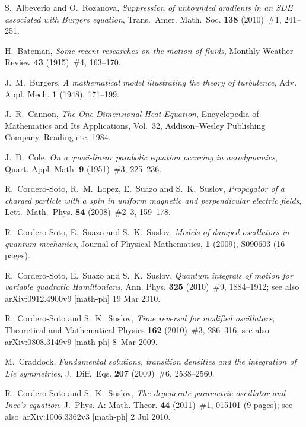\documentclass[12pt,reqno]{amsart}
\theoremstyle{plain}
\numberwithin{equation}{section}
\begin{document}
\begin{thebibliography}{99}
 S.~Albeverio and O.~Rozanova, \emph{Suppression of
unbounded gradients in an SDE associated with Burgers equation\/},
Trans.~Amer. Math.~Soc. \textbf{138} (2010)~\#1, 241--251.

 H.~Bateman, \emph{Some recent researches on the motion
of fluids\/}, Monthly Weather Review \textbf{43} (1915)~\#4, 163--170.

 J.~M.~Burgers, \emph{A mathematical model illustrating
the theory of turbulence\/}, Adv. Appl. Mech. \textbf{1} (1948), 171--199.

 J.~R.~Cannon, \textsl{The One-Dimensional Heat Equation\/},
Encyclopedia of Mathematics and Its Applications, Vol.~32, Addison--Wesley
Publishing Company, Reading etc, 1984.

 J.~D.~Cole, \emph{On a quasi-linear parabolic equation
occuring in aerodynamics\/}, Quart. Appl. Math. \textbf{9} (1951)~\#3,
225--236.

 R.~Cordero-Soto, R.~M.~Lopez, E.~Suazo and
S.~K.~Suslov, \emph{Propagator of a charged particle with a spin in uniform
magnetic and perpendicular electric fields\/}, Lett.~Math.~Phys. \textbf{84}
(2008)~\#2--3, 159--178.

 R.~Cordero-Soto, E.~Suazo and S.~K.~Suslov, \emph{Models of damped oscillators in quantum mechanics\/}, Journal of Physical
Mathematics, \textbf{1} (2009), S090603 (16 pages).

 R.~Cordero-Soto, E.~Suazo and S.~K.~Suslov, 
\emph{Quantum integrals of motion for variable quadratic Hamiltonians\/},
Ann. Phys. \textbf{325} (2010)~\#9, 1884--1912; see also arXiv:0912.4900v9
[math-ph] 19 Mar 2010.

 R.~Cordero-Soto and S.~K.~Suslov, \emph{Time reversal
for modified oscillators\/}, Theoretical and Mathematical Physics \textbf{162} (2010)~\#3, 286--316; see also arXiv:0808.3149v9 [math-ph] 8~Mar 2009.

 M.~Craddock, \emph{Fundamental solutions, transition
densities and the integration of Lie symmetries\/}, J.~Diff.~Eqs. \textbf{207} (2009)~\#6, 2538--2560.

 R.~Cordero-Soto and S.~K.~Suslov, \emph{The
degenerate parametric oscillator and Ince's equation\/}, J.~Phys. A: Math.
Theor. \textbf{44} (2011)~\#1, 015101 (9 pages); see also\emph{\ }arXiv:1006.3362v3 [math-ph] 2 Jul 2010.


\end{thebibliography}
\end{document}
